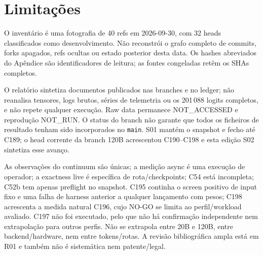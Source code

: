 \section{Limitações}
O inventário é uma fotografia de 40 refs em 2026-09-30, com 32 heads classificados como desenvolvimento. Não reconstrói o grafo completo de commits, forks apagados, refs ocultas ou estado posterior desta data. Os hashes abreviados do Apêndice são identificadores de leitura; as fontes congeladas retêm os SHAs completos.

O relatório sintetiza documentos publicados nas branches e no ledger; não reanalisa tensores, logs brutos, séries de telemetria ou os 201\,088 logits completos, e não repete qualquer execução. Raw data permanece NOT\_ACCESSED e reprodução NOT\_RUN. O status do branch não garante que todos os ficheiros de resultado tenham sido incorporados no \texttt{main}. S01 mantém o snapshot e fecho até C189; o head corrente da branch 120B acrescentou C190--C198 e esta edição S02 sintetiza esse avanço.

As observações do continuum são únicas; a medição async é uma execução de operador; a exactness live é específica de rota/checkpoints; C54 está incompleta; C52b tem apenas preflight no snapshot. C195 continha o screen positivo de input fixo e uma falha de harness anterior a qualquer lançamento com pesos; C198 acrescenta a medida natural C196, cujo NO-GO se limita ao perfil/workload avaliado. C197 não foi executado, pelo que não há confirmação independente nem extrapolação para outros perfis. Não se extrapola entre 20B e 120B, entre backend/hardware, nem entre tokens/rotas. A revisão bibliográfica ampla está em R01 e também não é sistemática nem patente/legal.
